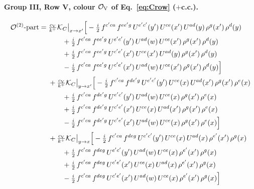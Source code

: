 \documentclass[10pt]{article}
\numberwithin{equation}{section}
\newcommand{\OO}{\mathcal O}
\newcommand{\KK}{\mathcal K}
\begin{document}
\paragraph{Group III, Row V, colour $\OO_{\rm V}$ of Eq.~\eqref{eq:Crow} ($+$c.c.).}
\begin{align}
\OO^{(2)}\text{-part}={}&\tfrac{c_{\rm V}}{k^+}\KK_C\big|_{x\to x'}\Big[-\tfrac{i}{2}\,f^{c'ca}\,f^{ee'g}\,U^{e'c'}(y')\,U^{ce}(x')\,U^{ad}(y)\,\rho^{g}(x')\,\rho^{d}(y)\notag\\
&\qquad+\tfrac{i}{2}\,f^{c'ca}\,f^{ee'g}\,U^{e'c'}(y')\,U^{ad}(w)\,U^{ce}(x')\,\rho^{g}(x')\,\rho^{d}(y)\notag\\
&\qquad+\tfrac{i}{2}\,f^{c'ca}\,f^{ee'g}\,U^{c'e'}(x')\,U^{ce}(x')\,U^{ad}(y)\,\rho^{g}(x')\,\rho^{d}(y)\notag\\
&\qquad-\tfrac{i}{2}\,f^{c'ca}\,f^{ee'g}\,U^{c'e'}(x')\,U^{ad}(w)\,U^{ce}(x')\,\rho^{g}(x')\,\rho^{d}(y)\Big]\notag\\
&+\tfrac{c_{\rm V}}{k^+}\KK_C\big|_{y\to x'}\Big[-\tfrac{i}{2}\,f^{c'ca}\,f^{de'g}\,U^{e'c'}(y')\,U^{ce}(x)\,U^{ad}(x')\,\rho^{g}(x')\,\rho^{e}(x)\notag\\
&\qquad+\tfrac{i}{2}\,f^{c'ca}\,f^{de'g}\,U^{e'c'}(y')\,U^{ad}(w)\,U^{ce}(x)\,\rho^{g}(x')\,\rho^{e}(x)\notag\\
&\qquad+\tfrac{i}{2}\,f^{c'ca}\,f^{de'g}\,U^{c'e'}(x')\,U^{ce}(x)\,U^{ad}(x')\,\rho^{g}(x')\,\rho^{e}(x)\notag\\
&\qquad-\tfrac{i}{2}\,f^{c'ca}\,f^{de'g}\,U^{c'e'}(x')\,U^{ad}(w)\,U^{ce}(x)\,\rho^{g}(x')\,\rho^{e}(x)\Big]\notag\\
&+\tfrac{c_{\rm V}}{k^+}\KK_C\big|_{y\to x}\Big[-\tfrac{i}{2}\,f^{c'ca}\,f^{deg}\,U^{e'c'}(y')\,U^{ce}(x)\,U^{ad}(x)\,\rho^{e'}(x')\,\rho^{g}(x)\notag\\
&\qquad+\tfrac{i}{2}\,f^{c'ca}\,f^{deg}\,U^{e'c'}(y')\,U^{ad}(w)\,U^{ce}(x)\,\rho^{e'}(x')\,\rho^{g}(x)\notag\\
&\qquad+\tfrac{i}{2}\,f^{c'ca}\,f^{deg}\,U^{c'e'}(x')\,U^{ce}(x)\,U^{ad}(x)\,\rho^{e'}(x')\,\rho^{g}(x)\notag\\
&\qquad-\tfrac{i}{2}\,f^{c'ca}\,f^{deg}\,U^{c'e'}(x')\,U^{ad}(w)\,U^{ce}(x)\,\rho^{e'}(x')\,\rho^{g}(x)\Big]
\end{align}
\end{document}

